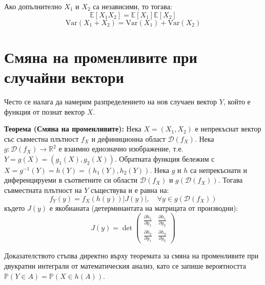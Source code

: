 \documentclass{article}
\begin{document}
Ако допълнително $X_1$ и $X_2$ са независими, то тогава:
\[
\mathbb{E}[X_1 X_2] = \mathbb{E}[X_1] \mathbb{E}[X_2]
\]
\[
\text{Var}(X_1 + X_2) = \text{Var}(X_1) + \text{Var}(X_2)
\]

\section{Смяна на променливите при случайни вектори}

Често се налага да намерим разпределението на нов случаен вектор $Y$, който е функция от познат вектор $X$.

\textbf{Теорема (Смяна на променливите):}
Нека $X = (X_1, X_2)$ е непрекъснат вектор със съвместна плътност $f_X$ и дефиниционна област $\mathcal{D}(f_X)$. 
Нека $g: \mathcal{D}(f_X) \to \mathbb{R}^2$ е взаимно еднозначно изображение, т.е. $Y = g(X) = (g_1(X), g_2(X))$.
Обратната функция бележим с $X = g^{-1}(Y) = h(Y) = (h_1(Y), h_2(Y))$. 
Нека $g$ и $h$ са непрекъснати и диференцируеми в съответните си области $\mathcal{D}(f_X)$ и $g(\mathcal{D}(f_X))$.
Тогава съвместната плътност на $Y$ съществува и е равна на:
\[
f_Y(y) = f_X(h(y)) |J(y)|, \quad \forall y \in g(\mathcal{D}(f_X))
\]
където $J(y)$ е якобианата (детерминантата на матрицата от производни):
\[
J(y) = \det \begin{pmatrix} 
\frac{\partial h_1}{\partial y_1} & \frac{\partial h_1}{\partial y_2} \\ 
\frac{\partial h_2}{\partial y_1} & \frac{\partial h_2}{\partial y_2} 
\end{pmatrix}
\]

Доказателството стъпва директно върху теоремата за смяна на променливите при двукратни интеграли от математическия анализ, като се запише вероятността $\mathbb{P}(Y \in A) = \mathbb{P}(X \in h(A))$.
\end{document}
